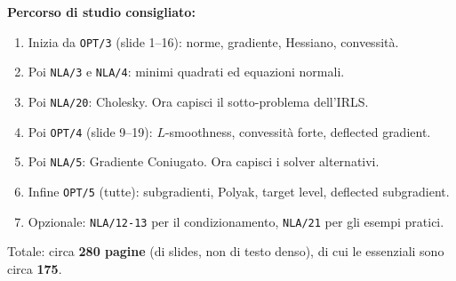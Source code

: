 \documentclass[a4paper,11pt]{article}
\theoremstyle{definition}
\begin{document}
\begin{riassunto}
\textbf{Percorso di studio consigliato:}
\begin{enumerate}[nosep]
  \item Inizia da \texttt{OPT/3} (slide 1--16): norme, gradiente, Hessiano, convessità.
  \item Poi \texttt{NLA/3} e \texttt{NLA/4}: minimi quadrati ed equazioni normali.
  \item Poi \texttt{NLA/20}: Cholesky. Ora capisci il sotto-problema dell'IRLS.
  \item Poi \texttt{OPT/4} (slide 9--19): $L$-smoothness, convessità forte, deflected gradient.
  \item Poi \texttt{NLA/5}: Gradiente Coniugato. Ora capisci i solver alternativi.
  \item Infine \texttt{OPT/5} (tutte): subgradienti, Polyak, target level, deflected subgradient.
  \item Opzionale: \texttt{NLA/12-13} per il condizionamento, \texttt{NLA/21} per gli esempi pratici.
\end{enumerate}
Totale: circa \textbf{280 pagine} (di slides, non di testo denso), di cui le essenziali sono circa \textbf{175}.
\end{riassunto}
\end{document}

